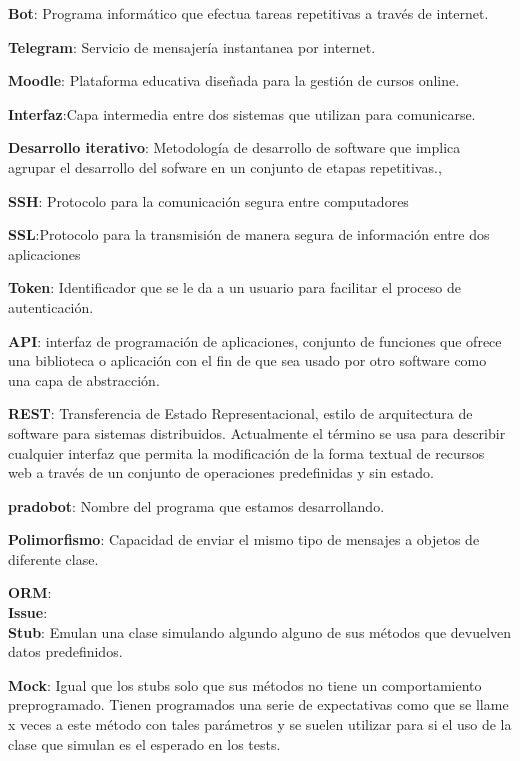 \documentclass[a4paper,11pt]{book}
\begin{document}
\textbf{Bot}: Programa informático que efectua tareas repetitivas a través de internet\cite{wikibot}\cite{wikibot2}.\par
\textbf{Telegram}: Servicio de mensajería instantanea por internet.\par
\textbf{Moodle}: Plataforma educativa diseñada para la gestión de cursos online.\par
\textbf{Interfaz}:Capa intermedia entre dos sistemas que utilizan para comunicarse.\par
\textbf{Desarrollo iterativo}: Metodología de desarrollo de software que implica agrupar el desarrollo del sofware en un conjunto de etapas repetitivas.\cite{wikiiterativo}, \cite{wikiiterativo2} \par
\textbf{SSH}: Protocolo para la comunicación segura entre computadores\cite{ssh}\par
\textbf{SSL}:Protocolo para la transmisión de manera segura de información entre dos aplicaciones\par
\textbf{Token}: Identificador que se le da a un usuario para facilitar el proceso de autenticación.\par
\textbf{API}:  interfaz de programación de aplicaciones, conjunto de funciones que ofrece una biblioteca o aplicación con el fin de que sea usado por otro software como una capa de abstracción.\par
\textbf{REST}:  Transferencia de Estado Representacional, estilo de arquitectura de software para sistemas distribuidos. Actualmente el término se usa para describir cualquier interfaz  que permita la modificación de la forma textual de recursos web a través de un conjunto de operaciones predefinidas y sin estado.\par\cite{rest}\cite{rest2}
\textbf{pradobot}:  Nombre del programa que estamos desarrollando.\par
\textbf{Polimorfismo}: Capacidad de enviar el mismo tipo de mensajes a objetos de diferente clase. \par
\textbf{ORM}:  
\\
\textbf{Issue}:  
\\
\textbf{Stub}: Emulan\cite{CC} una clase simulando algundo alguno de sus métodos que devuelven datos predefinidos.\par
\textbf{Mock}: Igual que los stubs solo que sus métodos no tiene un comportamiento preprogramado. Tienen programados una serie de expectativas como que se llame x veces a este método con tales parámetros y se suelen utilizar para si el uso de la clase que simulan es el esperado en los tests.\par
\end{document}
